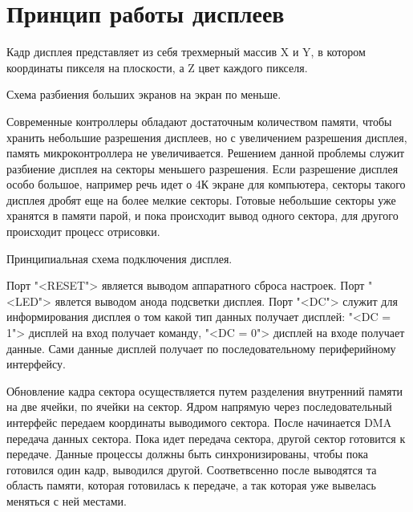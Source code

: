 \chapter{Принцип работы дисплеев}

	Кадр дисплея представляет из себя трехмерный массив X и Y, в котором координаты пикселя на плоскости, а Z цвет каждого пикселя. 
	
	{Схема разбиения больших экранов на экран по меньше.} %
	
	Современные контроллеры обладают достаточным количеством памяти, чтобы хранить небольшие разрешения дисплеев, но с увеличением разрешения дисплея, память микроконтроллера не увеличивается. Решением данной проблемы служит разбиение дисплея на секторы меньшего разрешения. Если разрешение дисплея особо большое, например речь идет о 4К экране для компьютера, секторы такого дисплея дробят еще на более мелкие секторы. Готовые небольшие секторы уже хранятся в памяти парой, и пока происходит вывод одного сектора, для другого происходит процесс отрисовки.
	
	{Принципиальная схема подключения дисплея.} %
	
	Порт "<RESET"> является выводом аппаратного сброса настроек. Порт "<LED"> явлется выводом анода подсветки дисплея. Порт "<DC"> служит для информирования дисплея о том какой тип данных получает дисплей: "<DC = 1"> дисплей на вход получает команду, "<DC = 0"> дисплей на входе получает данные. Сами данные дисплей получает по последовательному периферийному интерфейсу.
	
	Обновление кадра сектора осуществляется путем разделения внутренний памяти на две ячейки, по ячейки на сектор. Ядром напрямую через последовательный интерфейс передаем координаты выводимого сектора. После начинается DMA передача данных сектора. Пока идет передача сектора, другой сектор готовится к передаче. Данные процессы должны быть синхронизированы, чтобы пока готовился один кадр, выводился другой. Соответвсенно после выводятся та область памяти, которая готовилась к передаче, а так которая уже вывелась меняться с ней местами.

	
	
